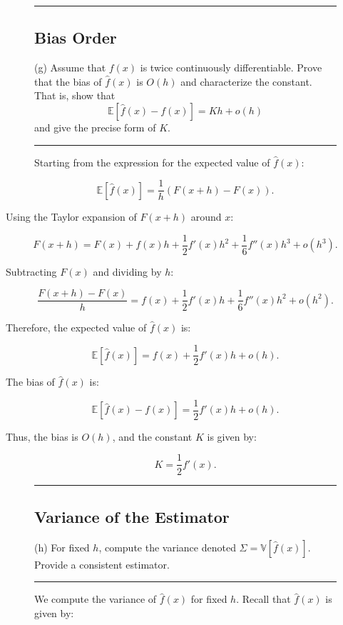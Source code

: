 \documentclass{article}
\newenvironment{colorparagraph}[1]{\par\color{#1}}{\par}
\begin{document}
\begin{figure}[H]
\begin{colorparagraph}{questioncolor}
\label{q2g}
\rule{\textwidth}{0.5pt}
\subsection{Bias Order}
(g) Assume that \( f(x) \) is twice continuously differentiable. Prove that the bias of \( \hat{f}(x) \) is \( O(h) \) and characterize the constant. That is, show that
\[
\mathbb{E}[\hat{f}(x) - f(x)] = Kh + o(h)
\]
and give the precise form of \( K \).

\rule{\textwidth}{0.5pt}
\end{colorparagraph}

Starting from the expression for the expected value of \( \hat{f}(x) \):
\end{figure}

\[
\mathbb{E}[\hat{f}(x)] = \frac{1}{h} \left( F(x + h) - F(x) \right).
\]

Using the Taylor expansion of \( F(x + h) \) around \( x \):

\[
F(x + h) = F(x) + f(x) h + \frac{1}{2} f'(x) h^2 + \frac{1}{6} f''(x) h^3 + o(h^3).
\]

Subtracting \( F(x) \) and dividing by \( h \):

\[
\frac{F(x + h) - F(x)}{h} = f(x) + \frac{1}{2} f'(x) h + \frac{1}{6} f''(x) h^2 + o(h^2).
\]

Therefore, the expected value of \( \hat{f}(x) \) is:

\[
\mathbb{E}[\hat{f}(x)] = f(x) + \frac{1}{2} f'(x) h + o(h).
\]

The bias of \( \hat{f}(x) \) is:

\[
\mathbb{E}[\hat{f}(x) - f(x)] = \frac{1}{2} f'(x) h + o(h).
\]

Thus, the bias is \( O(h) \), and the constant \( K \) is given by:

\[
K = \frac{1}{2} f'(x).
\]

\begin{figure}[H]
\begin{colorparagraph}{questioncolor}
\label{q2h}
\rule{\textwidth}{0.5pt}
\subsection{Variance of the Estimator}
(h) For fixed \( h \), compute the variance denoted \( \Sigma = \mathbb{V}[\hat{f}(x)] \). Provide a consistent estimator.

\rule{\textwidth}{0.5pt}
\end{colorparagraph}

We compute the variance of \( \hat{f}(x) \) for fixed \( h \). Recall that \( \hat{f}(x) \) is given by:
\end{figure}
\end{document}
